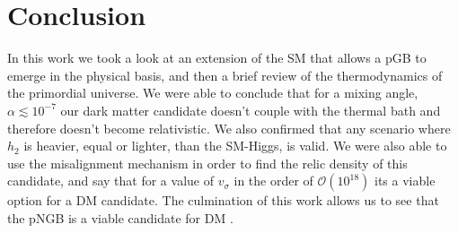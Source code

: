 \chapter{Conclusion}
\label{chapter:conclusion}

In this work we took a look at an extension of the SM that allows a pGB to emerge in the physical basis, and then a brief review of the thermodynamics of the primordial universe. We were able to conclude that for a mixing angle, $\alpha\lesssim 10^{-7}$ our dark matter candidate doesn't couple with the thermal bath and therefore doesn't become relativistic. We also confirmed that any scenario where $h_2$ is heavier, equal or lighter, than the SM-Higgs, is valid.
We were also able to use the misalignment mechanism in order to find the relic density of this candidate, and say that for a value of $v_\sigma$ in the order of $\mathcal{O}(10^{18})$ its a viable option for a DM candidate.
The culmination of this work allows us to see that the pNGB is a viable candidate for DM .

